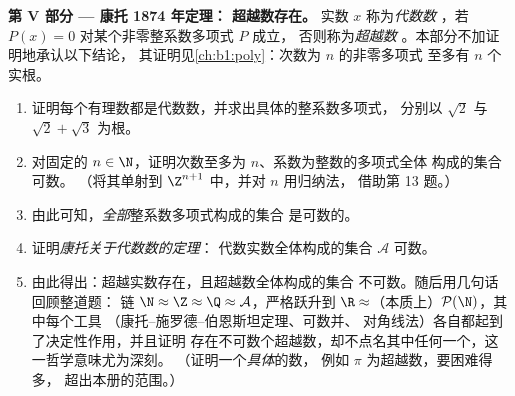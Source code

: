 \begin{problem}
\medskip
\noindent\textbf{第 V 部分 --- 康托 1874 年定理：
超越数存在。} 实数 $x$ 称为\emph{代数数}
，若 $P(x) = 0$ 对某个非零整系数多项式 $P$ 成立，
否则称为\emph{超越数}
。本部分不加证明地承认以下结论，
其证明见\cref{ch:b1:poly}：次数为 $n$ 的非零多项式
至多有 $n$ 个实根。
\begin{enumerate}[resume]
  \item 证明每个有理数都是代数数，并求出具体的整系数多项式，
        分别以 $\sqrt 2$ 与
        $\sqrt 2 + \sqrt 3$ 为根。
  \item 对固定的 $n \in \N$，证明次数至多为 $n$、系数为整数的多项式全体
        构成的集合可数。
        （将其单射到 $\Z^{n+1}$ 中，并对 $n$ 用归纳法，
        借助第 13 题。）
  \item 由此可知，\emph{全部}整系数多项式构成的集合
        是可数的。
  \item 证明\emph{康托关于代数数的定理}：
        代数实数全体构成的集合 $\mathcal{A}$ 可数。
  \item 由此得出：超越实数存在，且超越数全体构成的集合
        不可数。随后用几句话回顾整道题：
        链 $\N \approx
        \Z \approx \Q \approx \mathcal{A}$，严格跃升到 $\R
        \approx$（本质上）$\mathcal{P}(\N)$，其中每个工具
        （康托–施罗德–伯恩斯坦定理、可数并、
        对角线法）各自都起到了决定性作用，并且证明
        存在不可数个超越数，却不点名其中任何一个，这一哲学意味尤为深刻。
        （证明一个\emph{具体}的数，
        例如 $\pi$ 为超越数，要困难得多，
        超出本册的范围。）
\end{enumerate}
\end{problem}
